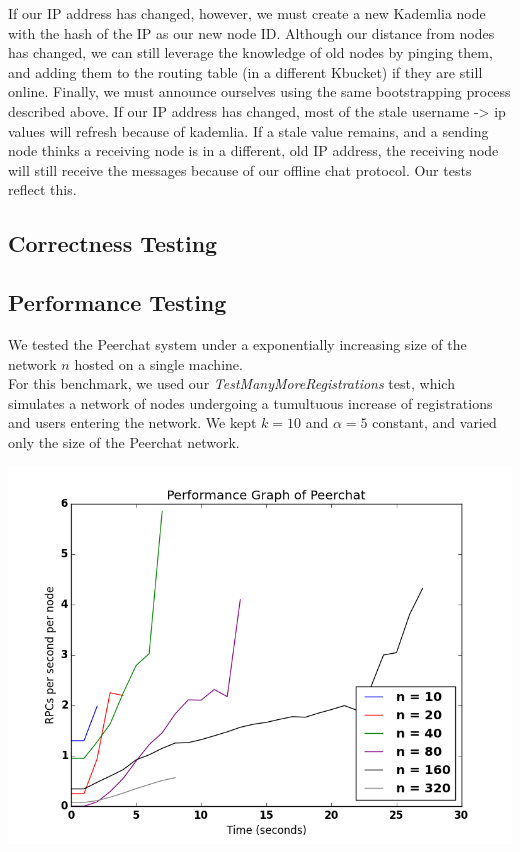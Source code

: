 \documentclass{article}
\begin{document}
If our IP address has changed, however, we must create a new Kademlia node with the hash of the IP as our new node ID. Although our distance from nodes has changed, we can still leverage the knowledge of old nodes by pinging them, and adding them to the routing table (in a different Kbucket)  if they are still online. Finally, we must announce ourselves using the same bootstrapping process described above. If our IP address has changed, most of the stale username -> ip values will refresh because of kademlia. If a stale value remains, and a sending node thinks a receiving node is in a different, old IP address, the receiving node will still receive the messages because of our offline chat protocol. Our tests reflect this. 

\subsection{Correctness Testing}
\subsection{Performance Testing}

We tested the Peerchat system under a exponentially increasing size of the network $n$ hosted on a single machine. \\

For this benchmark, we used our \textit{TestManyMoreRegistrations} test, which simulates a network of nodes undergoing a tumultuous increase of registrations and users entering the network. We kept $k = 10$ and $\alpha = 5$ constant, and varied only the size of the Peerchat network. 

\includegraphics[scale=0.8]{performance-sweep}
\end{document}
